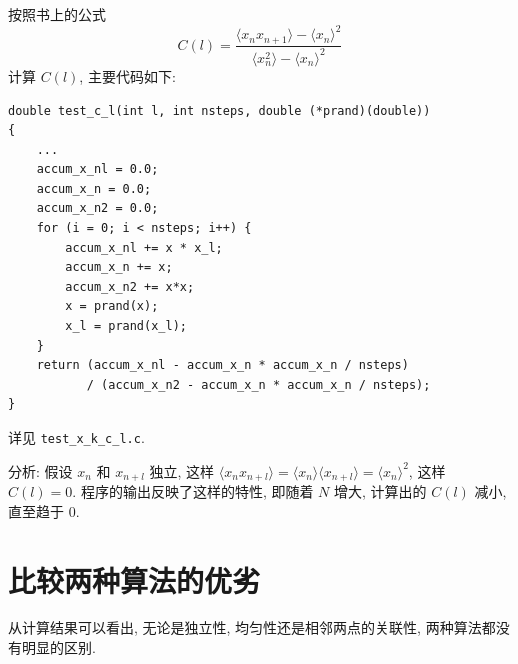 \documentclass{ctexart}
\begin{document}
按照书上的公式
\begin{equation}
C(l) = \frac{\langle x_n x_{n+1}\rangle - \langle x_n \rangle^2}
{\langle x_n^2 \rangle - \langle x_n\rangle ^2}
\end{equation}
计算 $C(l)$, 主要代码如下:
\begin{verbatim}
double test_c_l(int l, int nsteps, double (*prand)(double))
{
    ...
    accum_x_nl = 0.0;
    accum_x_n = 0.0;
    accum_x_n2 = 0.0;
    for (i = 0; i < nsteps; i++) {
        accum_x_nl += x * x_l;
        accum_x_n += x;
        accum_x_n2 += x*x;
        x = prand(x);
        x_l = prand(x_l);
    }
    return (accum_x_nl - accum_x_n * accum_x_n / nsteps)
           / (accum_x_n2 - accum_x_n * accum_x_n / nsteps);
}
\end{verbatim}
详见 \verb|test_x_k_c_l.c|.



分析: 假设 $x_n$ 和 $x_{n+l}$ 独立, 这样 $\langle x_n x_{n+l} \rangle =
\langle x_n\rangle \langle x_{n+l}\rangle = \langle x_n \rangle^2$,
这样 $C(l)=0$. 程序的输出反映了这样的特性, 即随着 $N$ 增大, 计算出的 $C(l)$
减小, 直至趋于 0.

\section{比较两种算法的优劣}
从计算结果可以看出, 无论是独立性, 均匀性还是相邻两点的关联性, 两种算法都没有明显的区别.
\end{document}
